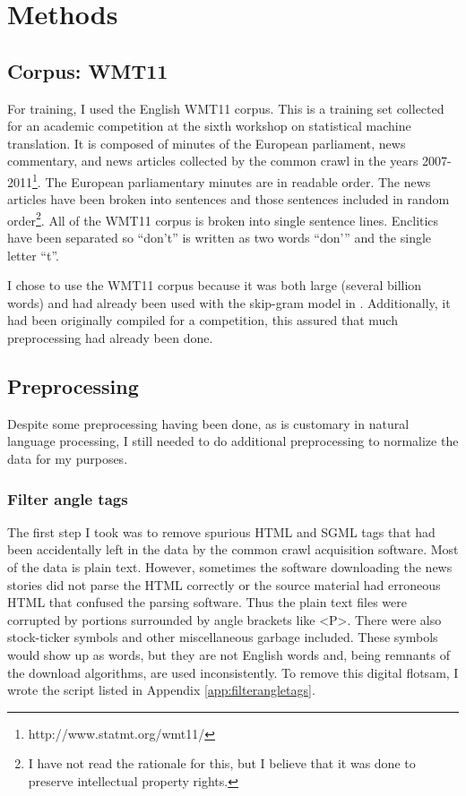 \documentclass[eric_thesis.tex]{subfiles}
\begin{document}
\chapter{Methods}

\section{Corpus: WMT11}

For training, I used the English WMT11 corpus. This is a training set collected 
for an academic competition at the sixth workshop on statistical machine 
translation. It is composed of minutes of the European parliament, news 
commentary, and news articles collected by the common crawl in the years 
2007-2011\footnote{http://www.statmt.org/wmt11/}. The European parliamentary 
minutes are in readable order. The news articles have been broken into sentences 
and those sentences included in random order\footnote{I have not read the 
rationale for this, but I believe that it was done to preserve intellectual 
property rights.}. All of the WMT11 corpus is broken into single sentence lines. 
Enclitics have been separated so ``don't'' is written as two words 
``don'\phantom{}'' and the single letter ``t''.

I chose to use the WMT11 corpus because it was both large (several billion 
words) and had already been used with the skip-gram model in 
\citep{Mikolov2013a}. Additionally, it had been originally 
compiled for a competition, this assured that much preprocessing had already 
been done.

\section{Preprocessing}

Despite some preprocessing having been done, as is customary in natural language 
processing, I still needed to do additional preprocessing to normalize the data 
for my purposes.

\subsection{Filter angle tags}

The first step I took was to remove spurious HTML and SGML tags that had been 
accidentally left in the data by the common crawl acquisition software. Most of 
the data is plain text. However, sometimes the software downloading the news 
stories did not parse the HTML correctly or the source material had erroneous 
HTML that confused the parsing software. Thus the plain text files were 
corrupted by portions surrounded by angle brackets like <P>. There were also 
stock-ticker symbols and other miscellaneous garbage included. These symbols 
would show up as words, but they are not English words and, being remnants of 
the download algorithms, are used inconsistently. To remove this digital 
flotsam, I wrote the script  listed in 
Appendix \ref{app:filterangletags}.
\end{document}
